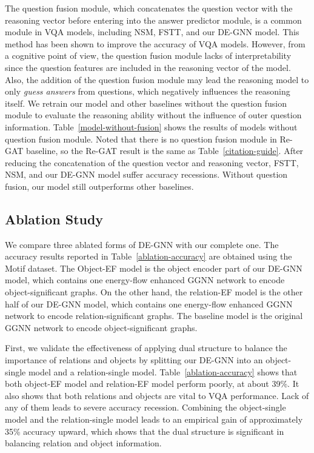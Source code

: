\documentclass[letterpaper]{article} %
\begin{document}
The question fusion module, which concatenates the question vector with the reasoning vector before entering into the answer predictor module, is a common module in VQA models, including NSM, FSTT, and our DE-GNN model. This method has been shown to improve the accuracy of VQA models. However, from a cognitive point of view, the question fusion module lacks of interpretability since the question features are included in the reasoning vector of the model. 
Also, the addition of the question fusion module may lead the reasoning model to only \emph{guess answers} from questions, which negatively influences the reasoning itself. 
We retrain our model and other baselines without the question fusion module to evaluate the reasoning ability without the influence of outer question information. Table~\ref{model-without-fusion} shows the results of models without question fusion module. Noted that there is no question fusion module in Re-GAT baseline, so the Re-GAT result is the same as Table~\ref{citation-guide}.
After reducing the concatenation of the question vector and reasoning vector, FSTT, NSM, and our DE-GNN model suffer accuracy recessions. Without question fusion, our model still outperforms other baselines.

\subsection{Ablation Study}

We compare three ablated forms of DE-GNN with our complete one. 
The accuracy results reported in Table~\ref{ablation-accuracy} are obtained using the Motif dataset. The Object-EF model is the object encoder part of our DE-GNN model, which contains one energy-flow enhanced GGNN network to encode object-significant graphs. 
On the other hand, the relation-EF model is the other half of our DE-GNN model, which contains one energy-flow enhanced GGNN network to encode relation-significant graphs. 
The baseline model is the original GGNN network to encode object-significant graphs.

First, we validate the effectiveness of applying dual structure to balance the importance of relations and objects by splitting our DE-GNN into an object-single model and a relation-single model. Table~\ref{ablation-accuracy} shows that both object-EF model and relation-EF model perform poorly, at about 39\%. 
It also shows that both relations and objects are vital to VQA performance. Lack of any of them leads to severe accuracy recession. Combining the object-single model and the relation-single model leads to an empirical gain of approximately 35\% accuracy upward, which shows that the dual structure is significant in balancing relation and object information. 
\end{document}
